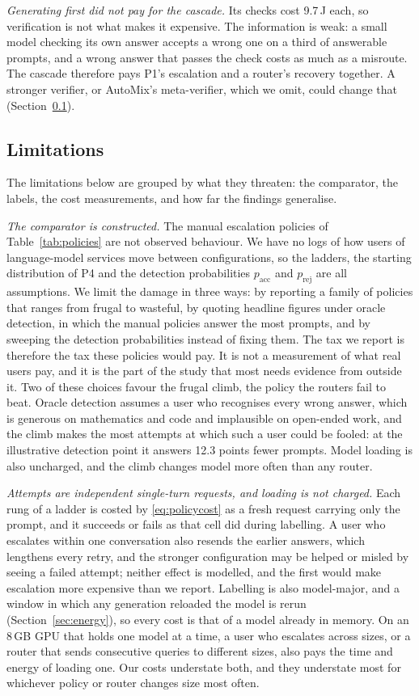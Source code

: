 \emph{Generating first did not pay for the cascade.} Its checks cost 9.7\,J
each, so verification is not what makes it expensive. The information is
weak: a small model checking its own answer accepts a wrong one on a third
of answerable prompts, and a wrong answer that passes the check costs as
much as a misroute. The cascade therefore pays P1's escalation and a
router's recovery together. A stronger verifier, or AutoMix's
meta-verifier, which we omit, could change that
(Section~\ref{sec:limitations}).

\subsection{Limitations}
\label{sec:limitations}

The limitations below are grouped by what they threaten: the comparator,
the labels, the cost measurements, and how far the findings generalise.

\emph{The comparator is constructed.} The manual escalation policies of
Table~\ref{tab:policies} are not observed behaviour. We have no logs of how
users of language-model services move between configurations, so the
ladders, the starting distribution of P4 and the detection probabilities
$p_{\mathrm{acc}}$ and $p_{\mathrm{rej}}$ are all assumptions. We limit the
damage in three ways: by reporting a family of policies that ranges from
frugal to wasteful, by quoting headline figures under oracle detection,
in which the manual policies answer the most prompts, and by sweeping the
detection probabilities instead of fixing them. The tax we report is therefore the
tax these policies would pay. It is not a measurement of what real users
pay, and it is the part of the study that most needs evidence from outside
it. Two of these choices favour the frugal climb, the policy the routers
fail to beat. Oracle detection assumes a user who recognises every wrong
answer, which is generous on mathematics and code and implausible on
open-ended work, and the climb makes the most attempts at which such a user
could be fooled: at the illustrative detection point it answers 12.3 points
fewer prompts. Model loading is also uncharged, and the climb changes model
more often than any router.

\emph{Attempts are independent single-turn requests, and loading is not
charged.} Each rung of a ladder is costed by \eqref{eq:policycost} as a
fresh request carrying only the prompt, and it succeeds or fails as that
cell did during labelling. A user who escalates within one conversation also
resends the earlier answers, which lengthens every retry, and the stronger
configuration may be helped or misled by seeing a failed attempt; neither
effect is modelled, and the first would make escalation more expensive than
we report. Labelling is also model-major, and a window in which any
generation reloaded the model is rerun (Section~\ref{sec:energy}), so every
cost is that of a model already in memory. On an 8\,GB GPU that holds one
model at a time, a user who escalates across sizes, or a router that sends
consecutive queries to different sizes, also pays the time and energy of
loading one. Our costs understate both, and they understate most for
whichever policy or router changes size most often.

